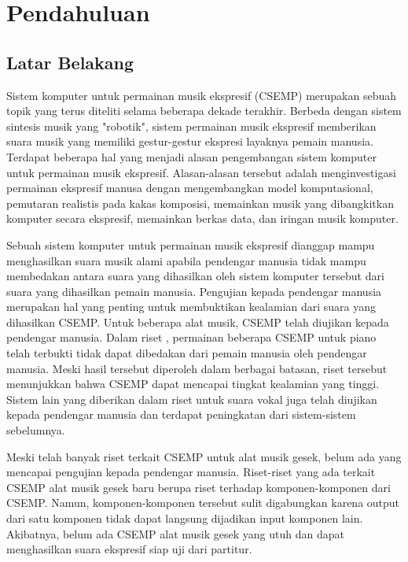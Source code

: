 \chapter{Pendahuluan}

\section{Latar Belakang}

Sistem komputer untuk permainan musik ekspresif (CSEMP) merupakan sebuah topik yang terus diteliti selama beberapa dekade terakhir. Berbeda dengan sistem sintesis musik yang "robotik", sistem permainan musik ekspresif memberikan suara musik yang memiliki gestur-gestur ekspresi layaknya pemain manusia. Terdapat beberapa hal yang menjadi alasan pengembangan sistem komputer untuk permainan musik ekspresif. Alasan-alasan tersebut adalah menginvestigasi permainan ekspresif manusa dengan mengembangkan model komputasional, pemutaran realistis pada kakas komposisi, memainkan musik yang dibangkitkan komputer secara ekspresif, memainkan berkas data, dan iringan musik komputer. \parencite{Kirke:2009:SCS:1592451.1592454}

Sebuah sistem komputer untuk permainan musik ekspresif dianggap mampu menghasilkan suara musik alami apabila pendengar manusia tidak mampu membedakan antara suara yang dihasilkan oleh sistem komputer tersebut dari suara yang dihasilkan pemain manusia. Pengujian kepada pendengar manusia merupakan hal yang penting untuk membuktikan kealamian dari suara yang dihasilkan CSEMP. Untuk beberapa alat musik, CSEMP telah diujikan kepada pendengar manusia. Dalam riset \parencite{schubert2017test}, permainan beberapa CSEMP untuk piano telah terbukti tidak dapat dibedakan dari pemain manusia oleh pendengar manusia. Meski hasil tersebut diperoleh dalam berbagai batasan, riset tersebut menunjukkan bahwa CSEMP dapat mencapai tingkat kealamian yang tinggi. Sistem lain yang diberikan dalam riset \parencite{bonada2017singing} untuk suara vokal juga telah diujikan kepada pendengar manusia dan terdapat peningkatan dari sistem-sistem sebelumnya.

Meski telah banyak riset terkait CSEMP untuk alat musik gesek, belum ada yang mencapai pengujian kepada pendengar manusia. Riset-riset yang ada terkait CSEMP alat musik gesek baru berupa riset terhadap komponen-komponen dari CSEMP. Namun, komponen-komponen tersebut sulit digabungkan karena output dari satu komponen tidak dapat langsung dijadikan input komponen lain. Akibatnya, belum ada CSEMP alat musik gesek yang utuh dan dapat menghasilkan suara ekspresif siap uji dari partitur.

